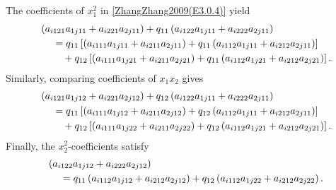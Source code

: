 \documentclass{amsart}
\theoremstyle{definition}
\theoremstyle{remark}
\numberwithin{equation}{section}
\begin{document}
The coefficients of $x_1^{2}$ in \eqref{ZhangZhang2009(E3.0.4)} yield
\begin{align}
   &\ \left(a_{i121} a_{1j11} + a_{i221} a_{2j11}\right) + q_{11}\left(a_{i122} a_{1j11} + a_{i222}a_{2j11}\right) \notag \\
    &\ \quad \ = q_{11} \left[ \left(a_{i111} a_{1j11} + a_{i211} a_{2j11}\right) + q_{11} \left(a_{i112} a_{1j11} + a_{i212}a_{2j11}\right) \right] \notag \\
    &\ \quad \quad \ + q_{12} \left[\left(a_{i111} a_{1j21} + a_{i211} a_{2j21}\right) + q_{11}\left(a_{i112} a_{1j21} + a_{i212}a_{2j21}\right)\right]. \label{ZhangZhang2009(C1ij)}
\end{align}
Similarly, comparing coefficients of $x_1x_2$ gives
\begin{align}
&\ \left(a_{i121} a_{1j12} + a_{i221} a_{2j12}\right) + q_{12}\left(a_{i122} a_{1j11} + a_{i222} a_{2j11} \right) \notag \\
 &\ \quad \ = q_{11} \left[\left(a_{i111} a_{1j12} + a_{i211} a_{2j12}\right) + q_{12} \left(a_{i112} a_{1j11} + a_{i212} a_{2j11} \right)\right] \notag \\
  &\ \quad \quad \ + q_{12} \left[ \left( a_{i111} a_{1j22} + a_{i211} a_{2j22}\right) + q_{12} \left(a_{i112} a_{1j21} + a_{i212} a_{2j21}\right)\right]. \label{ZhangZhang2009(C2ij)}
\end{align}
Finally, the $x_2^2$-coefficients satisfy
\begin{align}
   &\ \left( a_{i122} a_{1j12} + a_{i222} a_{2j12} \right) \notag \\ 
     &\ \quad \ = q_{11} \left(a_{i112} a_{1j12} + a_{i212} a_{2j12}\right) + q_{12} \left( a_{i112} a_{1j22} + a_{i212} a_{2j22}\right). \label{ZhangZhang2009(C3ij)}
\end{align}
\end{document}
